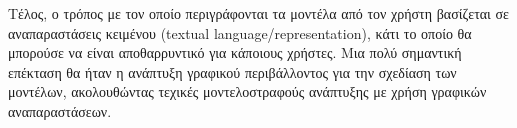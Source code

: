 Τέλος, ο τρόπος με τον οποίο περιγράφονται τα μοντέλα από τον χρήστη βασίζεται σε αναπαραστάσεις κειμένου (textual language/representation), κάτι το οποίο θα μπορούσε να είναι αποθαρρυντικό για κάποιους χρήστες. Μια πολύ σημαντική επέκταση θα ήταν η ανάπτυξη γραφικού περιβάλλοντος για την σχεδίαση των μοντέλων, ακολουθώντας τεχικές μοντελοστραφούς ανάπτυξης με χρήση γραφικών αναπαραστάσεων.